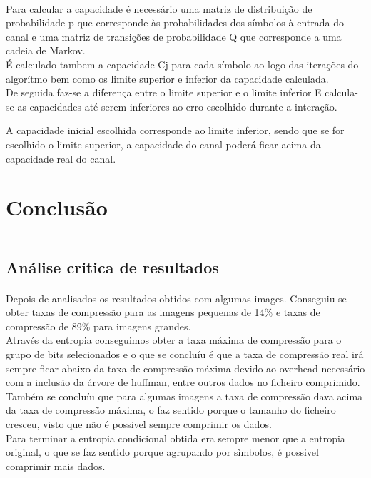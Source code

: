\documentclass[paper=a4, fontsize=11pt]{scrartcl}
\numberwithin{equation}{section}		%
\numberwithin{figure}{section}			%
\numberwithin{table}{section}				%
\newcommand{\horrule}[1]{\rule{\linewidth}{#1}} 	%
\begin{document}
\paragraph{} Para calcular a capacidade é necessário uma matriz de distribuição de probabilidade p que corresponde às probabilidades dos símbolos à entrada do canal e uma matriz de transições de probabilidade Q que corresponde a uma cadeia de Markov.
\\
É calculado tambem a capacidade Cj para cada símbolo ao logo das iterações do algorítmo bem como os limite superior e inferior da capacidade calculada.
\\
De seguida faz-se a diferença entre o limite superior e o limite inferior
E calcula-se as capacidades até serem inferiores ao erro escolhido durante a interação.

A capacidade inicial escolhida corresponde ao limite inferior, sendo que se for escolhido o limite superior, a capacidade do canal poderá ficar acima da capacidade real do canal.


\pagebreak 			%


\section{Conclusão}
\horrule{2pt} 
\subsection{Análise critica de resultados}
\paragraph{} Depois de analisados os resultados obtidos com algumas images. Conseguiu-se obter taxas de compressão para as imagens pequenas de 14\% e taxas de compressão de 89\% para imagens grandes.
\\
Através da entropia conseguimos obter a taxa máxima de compressão para o grupo de bits selecionados e o que se concluíu é que a taxa de compressão real irá sempre ficar abaixo da taxa de compressão máxima devido ao overhead necessário com a inclusão da árvore de huffman, entre outros dados no ficheiro comprimido.
\\
Também se concluíu que para algumas imagens a taxa de compressão dava acima da taxa de compressão máxima, o faz sentido porque o tamanho do ficheiro cresceu, visto que não é possivel sempre comprimir os dados.
\\Para terminar a entropia condicional obtida era sempre menor que a entropia original, o que se faz sentido porque agrupando por sìmbolos, é possivel comprimir mais dados.



\end{document}

